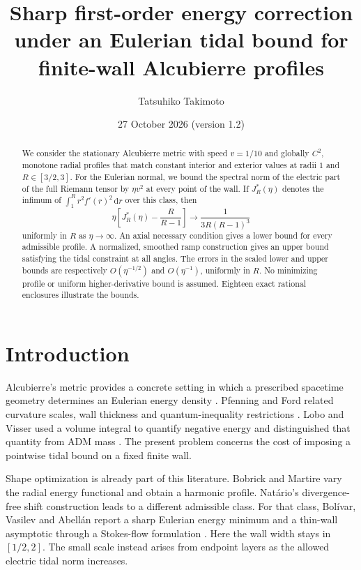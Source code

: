\documentclass[11pt,a4paper]{article}
\title{Sharp first-order energy correction under an Eulerian tidal bound for finite-wall Alcubierre profiles}
\author{Tatsuhiko Takimoto}
\date{27 October 2026 \quad (version 1.2)}
\newcommand{\dd}{\,\mathrm d}
\numberwithin{equation}{section}
\begin{document}
\maketitle

\begin{abstract}
We consider the stationary Alcubierre metric with speed \(v=1/10\) and globally
\(C^2\), monotone radial profiles that match constant interior and exterior
values at radii \(1\) and \(R\in[3/2,3]\). For the Eulerian normal, we bound the
spectral norm of the electric part of the full Riemann tensor by \(\eta v^2\)
at every point of the wall. If \(J_R^*(\eta)\) denotes the infimum of
\(\int_1^R r^2 f'(r)^2\dd r\) over this class, then
\[
 \eta\left[J_R^*(\eta)-\frac{R}{R-1}\right]
 \longrightarrow \frac{1}{3R(R-1)^3}
\]
uniformly in \(R\) as \(\eta\to\infty\). An axial necessary condition gives a
lower bound for every admissible profile. A normalized, smoothed ramp
construction gives an upper bound satisfying the tidal constraint at all
angles. The errors in the scaled lower and upper bounds are respectively
\(O(\eta^{-1/2})\) and \(O(\eta^{-1})\), uniformly in \(R\).
No minimizing profile or uniform higher-derivative bound is assumed.
Eighteen exact rational enclosures illustrate the bounds.
\end{abstract}

\section{Introduction}

Alcubierre's metric provides a concrete setting in which a prescribed
spacetime geometry determines an Eulerian energy density
\cite{alcubierre}. Pfenning and Ford related curvature scales, wall thickness
and quantum-inequality restrictions \cite{pfenningford}. Lobo and Visser
used a volume integral to quantify negative energy and distinguished that
quantity from ADM mass \cite{lobovisser}. The present problem concerns the
cost of imposing a pointwise tidal bound on a fixed finite wall.

Shape optimization is already part of this literature. Bobrick and Martire
\cite[arXiv v2, App.~A.3]{bobrickmartire} vary the radial energy functional
and obtain a harmonic profile. Nat\'ario's divergence-free
shift construction \cite{natario} leads to a different admissible class.
For that class, Bol\'ivar, Vasilev and Abell\'an report a sharp Eulerian
energy minimum and a thin-wall asymptotic through a Stokes-flow
formulation \cite{bolivar}. Here the wall width stays in \([1/2,2]\).
The small scale instead arises from endpoint layers as the allowed
electric tidal norm increases.
\end{document}

